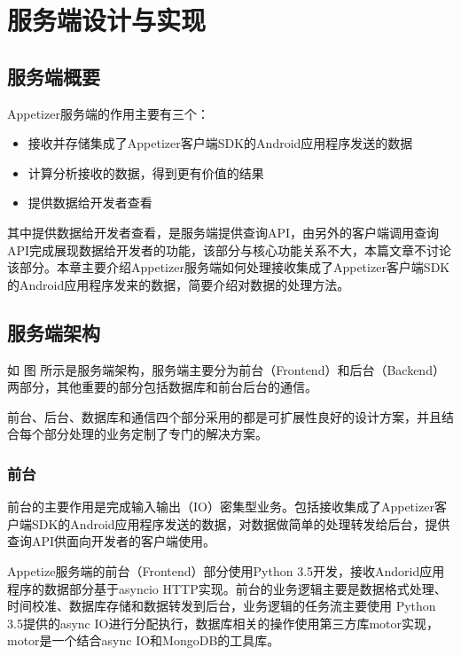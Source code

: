 
\chapter{服务端设计与实现}
\label{chap:server}

\section{服务端概要}
\label{sec:serverOverview}

Appetizer服务端的作用主要有三个：

\begin{itemize}
	\item 接收并存储集成了Appetizer客户端SDK的Android应用程序发送的数据
	\item 计算分析接收的数据，得到更有价值的结果
	\item 提供数据给开发者查看
\end{itemize}

其中提供数据给开发者查看，是服务端提供查询API，由另外的客户端调用查询API完成展现数据给开发者的功能，该部分与核心功能关系不大，本篇文章不讨论该部分。本章主要介绍Appetizer服务端如何处理接收集成了Appetizer客户端SDK的Android应用程序发来的数据，简要介绍对数据的处理方法。

\section{服务端架构}
\label{sec:serverArch}


如 图 所示是服务端架构，服务端主要分为前台（Frontend）和后台（Backend）两部分，其他重要的部分包括数据库和前台后台的通信。

前台、后台、数据库和通信四个部分采用的都是可扩展性良好的设计方案，并且结合每个部分处理的业务定制了专门的解决方案。

\subsection{前台}

前台的主要作用是完成输入输出（IO）密集型业务。包括接收集成了Appetizer客户端SDK的Android应用程序发送的数据，对数据做简单的处理转发给后台，提供查询API供面向开发者的客户端使用。

Appetize服务端的前台（Frontend）部分使用Python 3.5开发，接收Andorid应用程序的数据部分基于asyncio HTTP实现。前台的业务逻辑主要是数据格式处理、时间校准、数据库存储和数据转发到后台，业务逻辑的任务流主要使用 Python 3.5提供的async IO进行分配执行，数据库相关的操作使用第三方库motor实现，motor是一个结合async IO和MongoDB的工具库。

